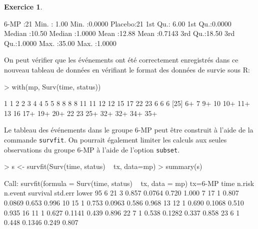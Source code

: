 \documentclass[11pt]{report}
\theoremstyle{definition}
\newtheorem{exo}{Exercice}[chapter]
\newcommand{\R}{\textsf{R}\xspace}
\begin{document}
\begin{exo}
\begin{sol}
\begin{Schunk}
\begin{Soutput}
 6-MP   :21   Min.   : 1.00   Min.   :0.0000  
 Placebo:21   1st Qu.: 6.00   1st Qu.:0.0000  
              Median :10.50   Median :1.0000  
              Mean   :12.88   Mean   :0.7143  
              3rd Qu.:18.50   3rd Qu.:1.0000  
              Max.   :35.00   Max.   :1.0000  
\end{Soutput}
\end{Schunk}
On peut vérifier que les événements ont été correctement enregistrés dans ce
nouveau tableau de données en vérifiant le format des données de survie sous
\R :
\begin{Schunk}
\begin{Sinput}
> with(mp, Surv(time, status))
\end{Sinput}
\begin{Soutput}
 [1]  1   1   2   2   3   4   4   5   5   8   8   8   8  11  11  12  12  15  17  22  23   6   6   6 
[25]  6+  7   9+ 10  10+ 11+ 13  16  17+ 19+ 20+ 22  23  25+ 32+ 32+ 34+ 35+
\end{Soutput}
\end{Schunk}

Le tableau des événements dans le groupe 6-MP peut être construit à l'aide
de la commande \texttt{survfit}. On pourrait également limiter les calculs
aux seules observations du groupe 6-MP à l'aide de l'option \texttt{subset}.
\begin{Schunk}
\begin{Sinput}
> s <- survfit(Surv(time, status) ~ tx, data=mp)
> summary(s)
\end{Sinput}
\begin{Soutput}
Call: survfit(formula = Surv(time, status) ~ tx, data = mp)
                tx=6-MP 
 time n.risk n.event survival std.err lower 95% CI upper 95% CI
    6     21       3    0.857  0.0764        0.720        1.000
    7     17       1    0.807  0.0869        0.653        0.996
   10     15       1    0.753  0.0963        0.586        0.968
   13     12       1    0.690  0.1068        0.510        0.935
   16     11       1    0.627  0.1141        0.439        0.896
   22      7       1    0.538  0.1282        0.337        0.858
   23      6       1    0.448  0.1346        0.249        0.807


\end{Soutput}
\end{Schunk}
\end{sol}
\end{exo}
\end{document}
